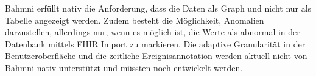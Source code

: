 \begin{description}[style=nextline, font=\bfseries]
\item[Beantwortung] 
Bahmni erfüllt nativ die Anforderung, dass die Daten als Graph und nicht nur als Tabelle angezeigt werden. Zudem besteht die Möglichkeit, Anomalien darzustellen, allerdings nur, wenn es möglich ist, die Werte als abnormal in der Datenbank mittels FHIR Import zu markieren. Die adaptive Granularität in der Benutzeroberfläche und die zeitliche Ereignisannotation werden aktuell nicht von Bahmni nativ unterstützt und müssten noch entwickelt werden.
\end{description}